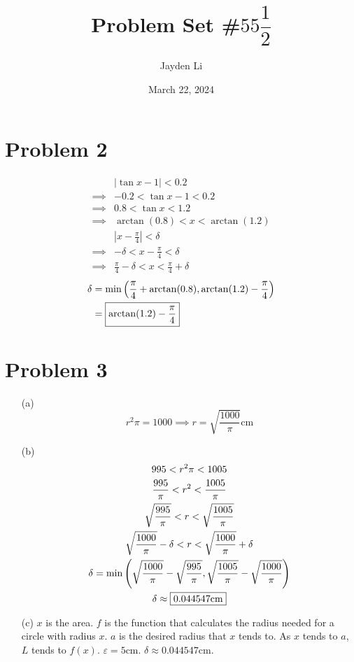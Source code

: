 \documentclass{article}
\title{Problem Set \#$55\dfrac{1}{2}$}
\author{Jayden Li}
\date{March 22, 2024}
\newcommand*{\paren}[1]{\ensuremath\left(#1\right)}
\newcommand*{\problem}[1]{\section*{Problem #1}}
\newcommand*{\abs}[1]{\ensuremath{\left|#1\right|}}
\newcommand*{\eps}{\varepsilon}
\begin{document}
\fontsize{12pt}{12pt}\selectfont
\setlength{\abovedisplayskip}{0pt}
\maketitle

\problem{2}
\begin{align*}
	&|\tan x-1|<0.2 \\
	\implies{}&-0.2<\tan x-1<0.2 \\
	\implies{}&0.8<\tan x<1.2 \\
	\implies{}&\arctan(0.8)<x<\arctan(1.2) \\
	&\abs{x-\frac{\pi}{4}}<\delta \\
	\implies{}&-\delta<x-\frac{\pi}{4}<\delta \\
	\implies{}&\frac{\pi}{4}-\delta<x<\frac{\pi}{4}+\delta
\end{align*}
\begin{align*}
	\delta&=\min\paren{\frac{\pi}{4}+\arctan(0.8),\arctan(1.2)-\frac{\pi}{4}} \\
	&=\boxed{\arctan(1.2)-\frac{\pi}{4}}
\end{align*}

\problem{3}
\begin{itemize}
	\item[(a)]
	\begin{equation*}
		r^2\pi=1000\implies\boxed{r=\sqrt{\frac{1000}{\pi}}\mathrm{cm}}
	\end{equation*}

	\item[(b)]
	\begin{gather*}
		995<r^2\pi<1005 \\
		\frac{995}{\pi}<r^2<\frac{1005}{\pi} \\
		\sqrt{\frac{995}{\pi}}<r<\sqrt{\frac{1005}{\pi}} \\
		\sqrt{\frac{1000}{\pi}}-\delta<r<\sqrt{\frac{1000}{\pi}}+\delta \\
		\delta=\min\paren{\sqrt{\frac{1000}{\pi}}-\sqrt{\frac{995}{\pi}},\sqrt{\frac{1005}{\pi}}-\sqrt{\frac{1000}{\pi}}} \\
		\delta\approx\boxed{0.044547\mathrm{cm}}
	\end{gather*}

	\item[(c)]
	$x$ is the area. $f$ is the function that calculates the radius needed for a circle with radius $x$. $a$ is the desired radius that $x$ tends to. As $x$ tends to $a$, $L$ tends to $f(x)$. $\eps=5\mathrm{cm}$. $\delta\approx0.044547\mathrm{cm}$.
\end{itemize}
\end{document}
